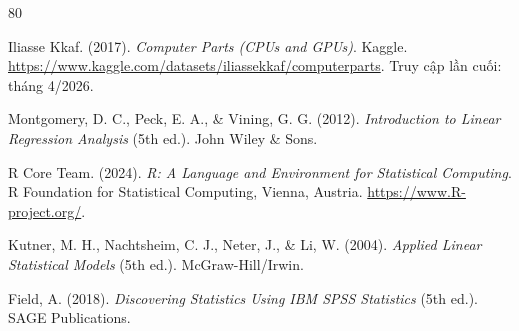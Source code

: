 \begin{thebibliography}{80}
	
	Iliasse Kkaf. (2017).
	\textit{Computer Parts (CPUs and GPUs)}.
	Kaggle.
	\url{https://www.kaggle.com/datasets/iliassekkaf/computerparts}.
	Truy cập lần cuối: tháng 4/2026.
	
	Montgomery, D. C., Peck, E. A., \& Vining, G. G. (2012).
	\textit{Introduction to Linear Regression Analysis} (5th ed.).
	John Wiley \& Sons.
	
	R Core Team. (2024).
	\textit{R: A Language and Environment for Statistical Computing}.
	R Foundation for Statistical Computing, Vienna, Austria.
	\url{https://www.R-project.org/}.
	
	Kutner, M. H., Nachtsheim, C. J., Neter, J., \& Li, W. (2004).
	\textit{Applied Linear Statistical Models} (5th ed.).
	McGraw-Hill/Irwin.
	
	Field, A. (2018).
	\textit{Discovering Statistics Using IBM SPSS Statistics} (5th ed.).
	SAGE Publications.
	
\end{thebibliography}
